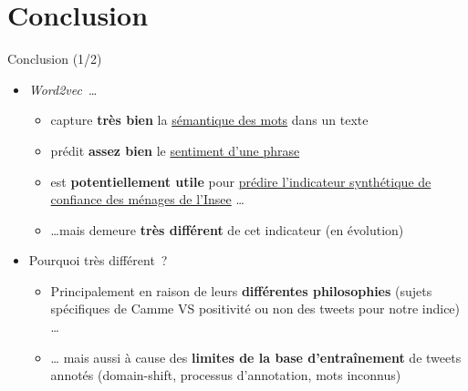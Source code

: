 \documentclass[10pt,xcolor=table,color={dvipsnames,usenames},ignorenonframetext,usepdftitle=false,french]{beamer}
\providecommand{\tightlist}{%
  \setlength{\parskip}{0pt}
  }
\begin{document}
\hypertarget{conclusion}{%
\section*{Conclusion}\label{conclusion}}

\begin{frame}{Conclusion (1/2)}
\protect\hypertarget{conclusion-12}{}

\begin{itemize}
\tightlist
\item
  \emph{Word2vec}~\dots

  \begin{itemize}
  \tightlist
  \item
    capture \textbf{très bien} la \underline{sémantique des mots} dans
    un texte
  \item
    prédit \textbf{assez bien} le \underline{sentiment d’une phrase}
  \item
    est \textbf{potentiellement utile} pour
    \underline{prédire l’indicateur synthétique de}
    \underline{confiance des ménages de l’Insee} \dots
  \item
    \dots mais demeure \textbf{très différent} de cet indicateur (en
    évolution)
  \end{itemize}
\end{itemize}

\bigskip

\pause

\begin{itemize}
\tightlist
\item
  Pourquoi très différent~?

  \begin{itemize}
  \tightlist
  \item
    Principalement en raison de leurs \textbf{différentes philosophies}
    \footnotesize (sujets spécifiques de Camme VS positivité ou non des
    tweets pour notre indice) \normalsize \dots
  \item
    \dots{} mais aussi à cause des \textbf{limites de la base
    d'entraînement} de tweets annotés \footnotesize (domain-shift,
    processus d'annotation, mots inconnus) \normalsize
  \end{itemize}
\end{itemize}

\end{frame}
\end{document}
